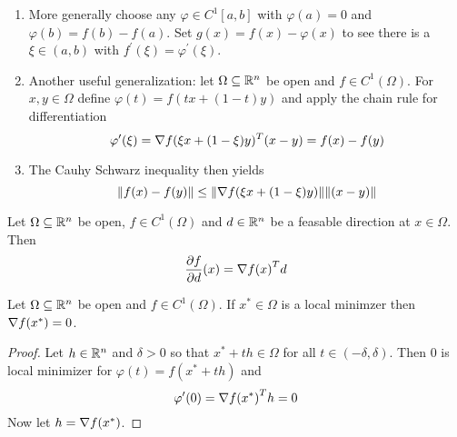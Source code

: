 \begin{remark}\hfill
    \begin{enumerate}
        \item More generally choose any \( \varphi \in C^1[a,b] \) with \( \varphi(a) = 0 \) and 
            \( \varphi(b) = f(b) - f(a) \). Set \( g(x) = f(x) - \varphi(x) \) to see there is a \( \xi \in (a,b) \) 
            with \( f^\prime(\xi) = \varphi^\prime(\xi)\). 
        \item Another useful generalization: let \( \Omega \subseteq \mathbb{R}^n \) be open and \( f \in C^1(\Omega) \). For
            \( x, y \in \Omega \) define \( \varphi(t) = f(tx + (1 - t)y) \) and apply the chain rule for differentiation
            \[
                 \varphi^\prime(\xi) = \nabla f(\xi x + (1 - \xi)y)^T(x - y) = f(x) - f(y)
            \]
        \item The Cauhy Schwarz inequality then yields
            \[
                  \|f(x) - f(y)\| \le \|\nabla f(\xi x + (1 - \xi)y)\| \|(x - y)\|
            \]
    \end{enumerate}
\end{remark}
\bigskip


\begin{lemma}\label{lemma:direction_derivative}
Let \( \Omega \subseteq \mathbb{R}^n \) be open, \( f \in C^1(\Omega) \) and \( d \in \mathbb{R}^n \) be a feasable direction 
at \( x \in \Omega \). Then
\[
    \frac{\partial f}{\partial d}(x) = \nabla{f(x)}^T d
\] 
\end{lemma}
\bigskip


\begin{theorem}\label{thm:fonc}
Let \( \Omega \subseteq \mathbb{R}^n \) be open and \( f \in C^1(\Omega) \). If \( x^* \in \Omega \) is a local minimzer then
\( \nabla f(x^*) = 0 \).
\end{theorem}

\begin{proof}
Let \( h \in \mathbb{R}^n \) and \( \delta > 0 \) so that \( x^* + th \in \Omega \) for all \( t \in (-\delta, \delta) \). 
Then \( 0 \) is local minimizer for \( \varphi(t) = f(x^* + th) \) and
\[
    \varphi^\prime(0) = {\nabla f(x^*)}^T h = 0
\]
Now let \( h = \nabla f(x^*) \). 
\end{proof}
\bigskip
